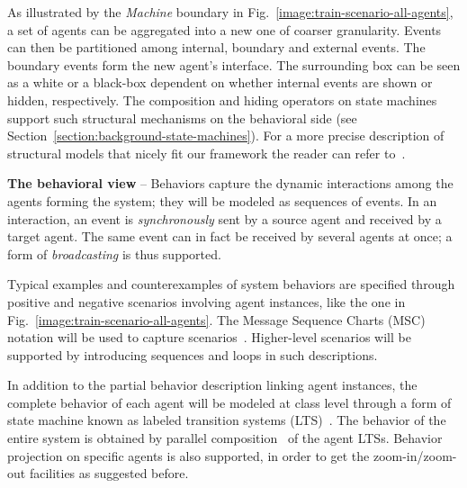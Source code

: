 As illustrated by the \emph{Machine} boundary in Fig.~\ref{image:train-scenario-all-agents}, a set of agents can be aggregated into a new one of coarser granularity. Events can then be partitioned among internal, boundary and external events. The boundary events form the new agent's interface. The surrounding box can be seen as a white or a black-box dependent on whether internal events are shown or hidden, respectively. The composition and hiding operators on state machines support such structural mechanisms on the behavioral side (see Section~\ref{section:background-state-machines}). For a more precise description of structural models that nicely fit our framework the reader can refer to~\cite{Magee:1995}.


\noindent \textbf{The behavioral view} -- Behaviors capture the dynamic interactions among the agents forming the system; they will be modeled as sequences of events. In an interaction, an event is \emph{synchronously} sent by a source agent and received by a target agent. The same event can in fact be received by several agents at once; a form of \emph{broadcasting} is thus supported. 

Typical examples and counterexamples of system behaviors are specified through positive and negative scenarios involving agent instances, like the one in Fig.~\ref{image:train-scenario-all-agents}. The Message Sequence Charts (MSC) notation will be used to capture scenarios~\cite{ITU:1996}. Higher-level scenarios will be supported by introducing sequences and loops in such descriptions.

In addition to the partial behavior description linking agent instances, the complete behavior of each agent will be modeled at class level through a form of state machine known as labeled transition systems (LTS)~\cite{Keller:1976, Milner:1989}. The behavior of the entire system is obtained by parallel composition~\cite{Hoare:1985} of the agent LTSs. Behavior  projection on specific agents is also supported, in order to get the zoom-in/zoom-out facilities as suggested before.

